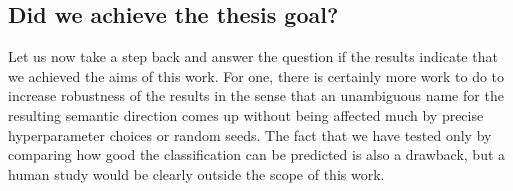 








\subsection{Did we achieve the thesis goal?}

Let us now take a step back and answer the question if the results indicate that we achieved the aims of this work. For one, there is certainly more work to do to increase robustness of the results in the sense that an unambiguous name for the resulting semantic direction comes up without being affected much by precise hyperparameter choices or random seeds. The fact that we have tested only by comparing how good the classification can be predicted is also a drawback, but a human study would be clearly outside the scope of this work.

